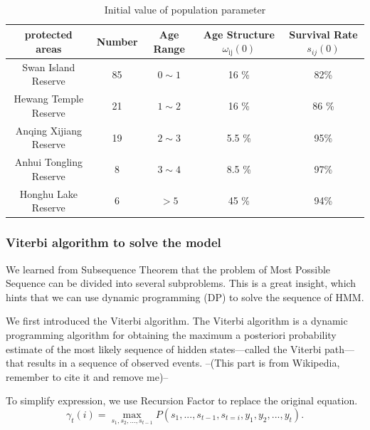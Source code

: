 \documentclass[12pt]{article}  %
\begin{document}
\begin{table}[!htbp]
\centering  
	\caption{Initial value of population parameter}
	
	\label{table_time}
	
	\begin{tabular}{cc|ccc}  
		
		\toprule   
		protected areas&Number &Age Range&Age Structure ${{\omega }_{\text{ij}}}(0)$  &Survival Rate ${{s}_{ij}}(0)$\\ 
		
		\midrule   
	Swan Island Reserve&85&	$0\sim 1$&16 \% &82\% \\ 
	Hewang Temple Reserve&21&$1\sim 2$&16 \% &86 \% 	\\  
	Anqing Xijiang Reserve&19&$2\sim 3$ & 5.5 \% &95\%  
		\\    
	Anhui Tongling Reserve&8&$3\sim 4$ &8.5 \% & 97\%	\\
	 Honghu Lake Reserve &6 &$>5$& 45 \% &94\%
		\\
		\bottomrule  
		
	\end{tabular}
\end{table}

\subsubsection{Viterbi algorithm to solve the model}



We learned from Subsequence Theorem that the problem of Most Possible Sequence can be divided into several subproblems. This is a great insight, which hints that we can use dynamic programming (DP) to solve the sequence of HMM.

We first introduced the Viterbi algorithm. The Viterbi algorithm is a dynamic programming algorithm for obtaining the maximum a posteriori probability estimate of the most likely sequence of hidden states—called the Viterbi path—that results in a sequence of observed events. --(This part is from Wikipedia, remember to cite it and remove me)--


\begin{Definition} 
To simplify expression, we use Recursion Factor to replace the original equation.
\begin{equation}
\gamma_t(i)=\max_{s_1,s_2,...,s_{t-1}}P(s_1,...,s_{t-1},s_{t=i},y_1,y_2,...,y_t).    
\end{equation}

\end{Definition}
\end{document}
